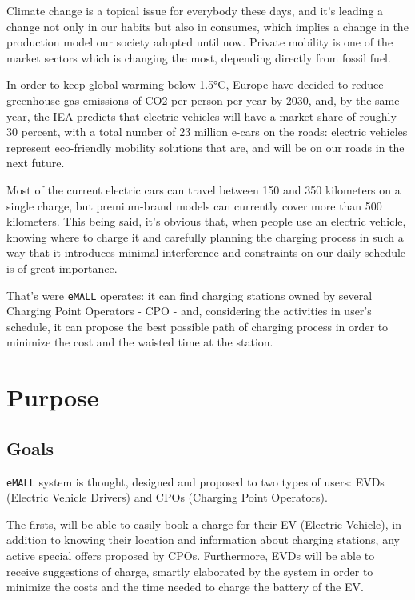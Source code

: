 Climate change is a topical issue for everybody these days, and it's leading a change not only in our habits but also in consumes, which implies a change in the production model our society adopted until now. Private mobility is one of the market sectors which is changing the most, depending directly from fossil fuel. 

In order to keep global warming below 1.5°C, Europe have decided to reduce greenhouse gas emissions of CO2 per
person per year by 2030, and, by the same year, the IEA predicts that electric vehicles will have a market share of roughly 30 percent, with a total number of 23 million e-cars on the roads: electric vehicles represent eco-friendly mobility solutions that are, and will be on our roads in the next future. 

Most of the current electric cars can travel between 150 and 350 kilometers on a single charge, but premium-brand models can currently cover more than 500 kilometers. This being said, it's obvious that, when people use an electric vehicle, knowing where to charge it and carefully planning the
charging process in such a way that it introduces minimal interference and constraints on our daily schedule
is of great importance.

That's were \verb|eMALL| operates: it can find charging stations owned by several Charging Point Operators - CPO - and,
considering the activities in user's schedule, it can propose the best possible path of charging process
in order to minimize the cost and the waisted time at the station.
\newpage


\section{Purpose}
\label{sec:purpose}%

\subsection{Goals}
\label{subsec:goals}%
\setcounter{g}{1}
\newcommand{\cg}{\theg\stepcounter{g}}
\verb|eMALL| system is thought, designed and proposed to two types of users: EVDs (Electric Vehicle Drivers) and CPOs (Charging Point Operators).

The firsts, will be able to easily book a charge for their EV (Electric Vehicle), in addition to knowing their location and information about charging stations, any active special offers proposed by CPOs. Furthermore, EVDs will be able to receive suggestions of charge, smartly elaborated by the system in order to minimize the costs and the time needed to charge the battery
of the EV\@.

